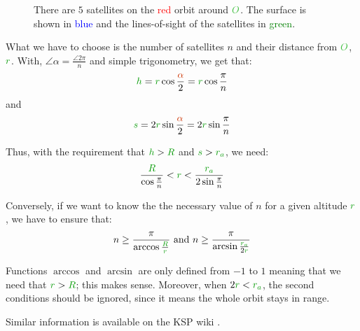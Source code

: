 \begin{figure}[H]
\centering
\def\n{5}
\caption{
	There are $\n$ satellites on the \textcolor{red}{red} orbit around
	$\posit{O}$. The surface is shown in \textcolor{blue}{blue} and
	the lines-of-sight of the satellites in \textcolor{green}{green}.
}
\end{figure}

What we have to choose is the number of satellites $n$ and their
distance from $\posit{O}$, $\dist{r}$. With, $\angle{\alpha} = \frac
{\angle{2\pi}} n$ and simple trigonometry, we get that:
\[
\dist{h}
= \dist{r} \cos \frac {\angle{\alpha}} 2
= \dist{r} \cos \frac {\pi} n
\]
and
\[
\dist{s}
= 2 \dist{r} \sin \frac {\angle{\alpha}} 2
= 2 \dist{r} \sin \frac {\pi} n
\]

Thus, with the requirement that $\dist{h} > \dist{R}$ and $\dist{s} >
\dist{r_a}$, we need:
\[
\frac {\dist{R}} {\cos \frac {\pi} n}
<
\dist{r}
<
\frac {\dist{r_a}} {2 \sin \frac {\pi} n}
\]

Conversely, if we want to know the the necessary value of $n$ for a
given altitude $\dist{r}$, we have to ensure that:
\[
n
\ge
\frac {\pi} {\arccos \frac {\dist{R}} {\dist{r}}}
\text{ and }
n
\ge
\frac {\pi} {\arcsin \frac {\dist{r_a}} {2 \dist{r}}}
\]

\begin{remark}
Functions $\arccos$ and $\arcsin$ are only defined from $-1$ to $1$
meaning that we need that $\dist{r} > \dist{R}$; this makes sense.
Moreover, when $2 \dist{r} < \dist{r_a}$, the second conditions should
be ignored, since it means the whole orbit stays in range.
\end{remark}

Similar information is available on the KSP wiki \cite{coverage}.


